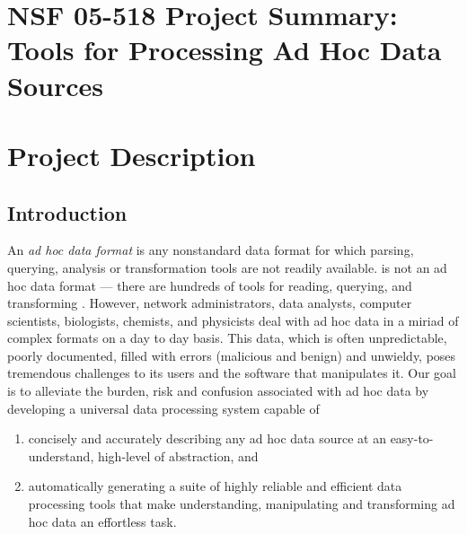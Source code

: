 \documentclass[11pt]{article}
\begin{document}
\setcounter{page}{1}
\appendix
\section{NSF 05-518 Project Summary:  Tools for Processing Ad Hoc Data Sources}

\newpage
\setcounter{page}{1}
\section{Project Description}

\subsection{Introduction}
\label{ssec:intro}

An {\em ad hoc data format} is any nonstandard data format for which
parsing, querying, analysis or transformation tools are not readily
available.  \xml{} is not an ad hoc data format --- there are hundreds
of tools for reading, querying, and transforming \xml{}.  However,
network administrators,
data analysts, computer scientists,
biologists, chemists, and physicists deal with ad hoc
data in a miriad of complex formats on a day to day basis.
This data, which is often unpredictable, poorly documented,
filled with errors (malicious and benign) and unwieldy,
poses tremendous challenges to its users and the software
that manipulates it.  
Our goal is to alleviate the burden, risk and confusion associated
with ad hoc data by developing a universal data processing system
capable of 

\begin{enumerate}
\item concisely and accurately describing any ad hoc data source at an 
easy-to-understand, high-level of abstraction, and
\item automatically generating a suite of highly reliable and
efficient data processing tools that make understanding, manipulating 
and transforming ad hoc data an effortless task.
\end{enumerate}
\end{document}
